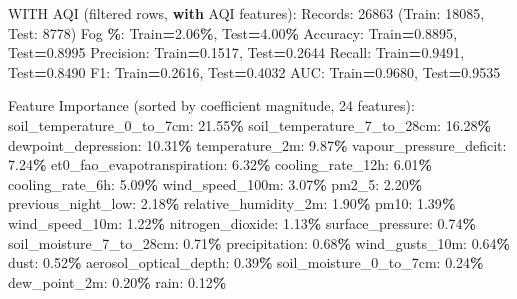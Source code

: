 \documentclass[
  letterpaper,
  DIV=11,
  numbers=noendperiod]{scrartcl}
\newenvironment{Shaded}{\begin{snugshade}}{\end{snugshade}}
\newcommand{\BuiltInTok}[1]{#1}
\newcommand{\ControlFlowTok}[1]{\textcolor[rgb]{0.13,0.29,0.53}{\textbf{#1}}}
\newcommand{\DecValTok}[1]{\textcolor[rgb]{0.00,0.00,0.81}{#1}}
\newcommand{\FloatTok}[1]{\textcolor[rgb]{0.00,0.00,0.81}{#1}}
\newcommand{\NormalTok}[1]{#1}
\newcommand{\OperatorTok}[1]{\textcolor[rgb]{0.81,0.36,0.00}{\textbf{#1}}}
\begin{document}
\begin{Shaded}
\begin{Highlighting}[]
\NormalTok{WITH AQI (filtered rows, }\ControlFlowTok{with}\NormalTok{ AQI features):}
\NormalTok{  Records: }\DecValTok{26863}\NormalTok{ (Train: }\DecValTok{18085}\NormalTok{, Test: }\DecValTok{8778}\NormalTok{)}
\NormalTok{  Fog }\OperatorTok{\%}\NormalTok{: Train}\OperatorTok{=}\FloatTok{2.06}\OperatorTok{\%}\NormalTok{, Test}\OperatorTok{=}\FloatTok{4.00}\OperatorTok{\%}
\NormalTok{  Accuracy: Train}\OperatorTok{=}\FloatTok{0.8895}\NormalTok{, Test}\OperatorTok{=}\FloatTok{0.8995}
\NormalTok{  Precision: Train}\OperatorTok{=}\FloatTok{0.1517}\NormalTok{, Test}\OperatorTok{=}\FloatTok{0.2644}
\NormalTok{  Recall: Train}\OperatorTok{=}\FloatTok{0.9491}\NormalTok{, Test}\OperatorTok{=}\FloatTok{0.8490}
\NormalTok{  F1: Train}\OperatorTok{=}\FloatTok{0.2616}\NormalTok{, Test}\OperatorTok{=}\FloatTok{0.4032}
\NormalTok{  AUC: Train}\OperatorTok{=}\FloatTok{0.9680}\NormalTok{, Test}\OperatorTok{=}\FloatTok{0.9535}

\NormalTok{  Feature Importance (}\BuiltInTok{sorted}\NormalTok{ by coefficient magnitude, }\DecValTok{24}\NormalTok{ features):}
\NormalTok{    soil\_temperature\_0\_to\_7cm: }\FloatTok{21.55}\OperatorTok{\%}
\NormalTok{    soil\_temperature\_7\_to\_28cm: }\FloatTok{16.28}\OperatorTok{\%}
\NormalTok{    dewpoint\_depression: }\FloatTok{10.31}\OperatorTok{\%}
\NormalTok{    temperature\_2m: }\FloatTok{9.87}\OperatorTok{\%}
\NormalTok{    vapour\_pressure\_deficit: }\FloatTok{7.24}\OperatorTok{\%}
\NormalTok{    et0\_fao\_evapotranspiration: }\FloatTok{6.32}\OperatorTok{\%}
\NormalTok{    cooling\_rate\_12h: }\FloatTok{6.01}\OperatorTok{\%}
\NormalTok{    cooling\_rate\_6h: }\FloatTok{5.09}\OperatorTok{\%}
\NormalTok{    wind\_speed\_100m: }\FloatTok{3.07}\OperatorTok{\%}
\NormalTok{    pm2\_5: }\FloatTok{2.20}\OperatorTok{\%}
\NormalTok{    previous\_night\_low: }\FloatTok{2.18}\OperatorTok{\%}
\NormalTok{    relative\_humidity\_2m: }\FloatTok{1.90}\OperatorTok{\%}
\NormalTok{    pm10: }\FloatTok{1.39}\OperatorTok{\%}
\NormalTok{    wind\_speed\_10m: }\FloatTok{1.22}\OperatorTok{\%}
\NormalTok{    nitrogen\_dioxide: }\FloatTok{1.13}\OperatorTok{\%}
\NormalTok{    surface\_pressure: }\FloatTok{0.74}\OperatorTok{\%}
\NormalTok{    soil\_moisture\_7\_to\_28cm: }\FloatTok{0.71}\OperatorTok{\%}
\NormalTok{    precipitation: }\FloatTok{0.68}\OperatorTok{\%}
\NormalTok{    wind\_gusts\_10m: }\FloatTok{0.64}\OperatorTok{\%}
\NormalTok{    dust: }\FloatTok{0.52}\OperatorTok{\%}
\NormalTok{    aerosol\_optical\_depth: }\FloatTok{0.39}\OperatorTok{\%}
\NormalTok{    soil\_moisture\_0\_to\_7cm: }\FloatTok{0.24}\OperatorTok{\%}
\NormalTok{    dew\_point\_2m: }\FloatTok{0.20}\OperatorTok{\%}
\NormalTok{    rain: }\FloatTok{0.12}\OperatorTok{\%}


\end{Highlighting}
\end{Shaded}
\end{document}
